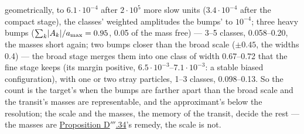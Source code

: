 \begin{sloppypar}
geometrically, to $6.1\cdot10^{-4}$ after $2\cdot10^5$ more slow units ($3.4\cdot10^{-4}$ after the compact stage), the
classes' weighted amplitudes the bumps' to $10^{-4}$; three heavy bumps ($\sum_k\lvert A_k\rvert/a_{\max} = 0.95$, 0.05 of
the mass free) --- 3--5 classes, 0.058--0.20, the masses short again; two bumps closer than the broad scale ($\pm0.45$,
the widths 0.4) --- the broad stage merges them into one class of width 0.67--0.72 that the fine stage keeps (its
margin positive, $6.5\cdot10^{-3}$--$7.1\cdot10^{-3}$: a stable biased configuration), with one or two stray
particles, 1--3 classes, 0.098--0.13. So the count is the target's when the bumps are farther apart than the broad
scale and the transit's masses are representable, and the approximant's below the resolution; the scale and the
masses, the memory of the transit, decide the rest --- the masses are \hyperref[res:thmDppp:34]{Proposition
D$'''$.34}'s remedy, the scale is not.
\end{sloppypar}

